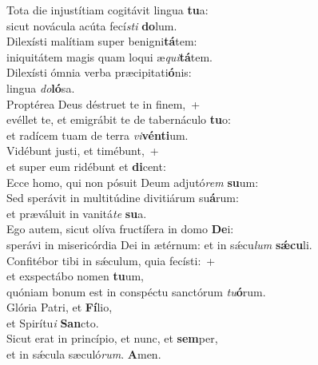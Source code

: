 \evenverse Tota die injustítiam cogitávit lingua \textbf{tu}a:~\*\\
\evenverse sicut novácula acúta fecí\textit{sti} \textbf{do}lum.\\
\oddverse Dilexísti malítiam super benigni\textbf{tá}tem:~\*\\
\oddverse iniquitátem magis quam loqui æ\textit{qui}\textbf{tá}tem.\\
\evenverse Dilexísti ómnia verba præcipitati\textbf{ó}nis:~\*\\
\evenverse lingua \textit{do}\textbf{ló}sa.\\
\oddverse Proptérea Deus déstruet te in finem,~+\\
\oddverse  evéllet te, et emigrábit te de tabernáculo \textbf{tu}o:~\*\\
\oddverse et radícem tuam de terra \textit{vi}\textbf{vén}\textbf{ti}um.\\
\evenverse Vidébunt justi, et timébunt,~+\\
\evenverse  et super eum ridébunt et \textbf{di}cent:~\*\\
\evenverse Ecce homo, qui non pósuit Deum adjutó\textit{rem} \textbf{su}um:\\
\oddverse Sed sperávit in multitúdine divitiárum su\textbf{á}rum:~\*\\
\oddverse et præváluit in vanitá\textit{te} \textbf{su}a.\\
\evenverse Ego autem, sicut olíva fructífera in domo \textbf{De}i:~\*\\
\evenverse sperávi in misericórdia Dei in ætérnum: et in sǽcu\textit{lum} \textbf{sǽ}\textbf{cu}li.\\
\oddverse Confitébor tibi in sǽculum, quia fecísti:~+\\
\oddverse  et exspectábo nomen \textbf{tu}um,~\*\\
\oddverse quóniam bonum est in conspéctu sanctórum \textit{tu}\textbf{ó}rum.\\
\evenverse Glória Patri, et \textbf{Fí}lio,~\*\\
\evenverse et Spirítu\textit{i} \textbf{San}cto.\\
\oddverse Sicut erat in princípio, et nunc, et \textbf{sem}per,~\*\\
\oddverse et in sǽcula sæculó\textit{rum}. \textbf{A}men.\\
